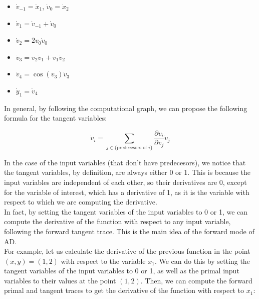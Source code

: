\begin{itemize}
    \item $\dot{v}_{-1} = \dot{x}_1$, $\dot{v}_{0} = \dot{x}_2$
    \item $\dot{v}_{1} = \dot{v}_{-1} + \dot{v}_{0}$
    \item $\dot{v}_{2} = 2 v_{0} \dot{v}_{0}$
    \item $\dot{v}_{3} = v_{2} \dot{v}_{1} + v_{1} \dot{v}_{2}$
    \item $\dot{v}_{4} = \cos(v_{3}) \dot{v}_{3}$
    \item $\dot{y}_1 = \dot{v}_4$
\end{itemize}

In general, by following the computational graph, we can propose the following formula for
the tangent variables:

\begin{equation}
    \dot{v}_i = \sum_{j \in \{\text{predecesors of } i\}} \frac{\partial v_i}{\partial v_j} \dot{v}_j
\end{equation}

In the case of the input variables (that don't have predecesors), we notice that the tangent
variables, by definition, are always either 0 or 1. This is because the input variables 
are independent of each other, so their derivatives are 0, except for the variable 
of interest, which has a derivative of 1, as it is the variable with respect to which 
we are computing the derivative.\\

In fact, by setting the tangent variables of the input variables to 0 or 1, we can compute
the derivative of the function with respect to any input variable, following the forward 
tangent trace. This is the main idea of the forward mode of AD.\\

For example, let us calculate the derivative of the previous function in the point
$(x, y) = (1, 2)$ with respect to the variable $x_1$. We can do this by setting the
tangent variables of the input variables to 0 or 1, as well as the primal input variables
to their values at the point $(1, 2)$. Then, we can compute the forward primal and
tangent traces to get the derivative of the function with respect to $x_1$:

